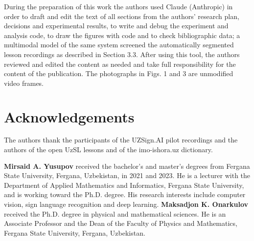 \documentclass[a4paper,fleqn]{cas-dc}
\begin{document}
During the preparation of this work the authors used Claude (Anthropic) \cite{2026_anthropic_claude} in order to draft and edit the text of all sections from the authors' research plan, decisions and experimental results, to write and debug the experiment and analysis code, to draw the figures with code and to check bibliographic data; a multimodal model of the same system screened the automatically segmented lesson recordings as described in Section 3.3. After using this tool, the authors reviewed and edited the content as needed and take full responsibility for the content of the publication. The photographs in Figs. 1 and 3 are unmodified video frames.

\hypertarget{acknowledgements}{%
\section*{Acknowledgements}\label{acknowledgements}}

The authors thank the participants of the UZSign.AI pilot recordings and the authors of the open UzSL lessons and of the imo-ishora.uz dictionary.



\bio{}
\textbf{Mirsaid A. Yusupov} received the bachelor's and master's degrees from Fergana State University, Fergana, Uzbekistan, in 2021 and 2023. He is a lecturer with the Department of Applied Mathematics and Informatics, Fergana State University, and is working toward the Ph.D. degree. His research interests include computer vision, sign language recognition and deep learning.
\endbio
\bio{}
\textbf{Maksadjon K. Onarkulov} received the Ph.D. degree in physical and mathematical sciences. He is an Associate Professor and the Dean of the Faculty of Physics and Mathematics, Fergana State University, Fergana, Uzbekistan.
\endbio
\end{document}
